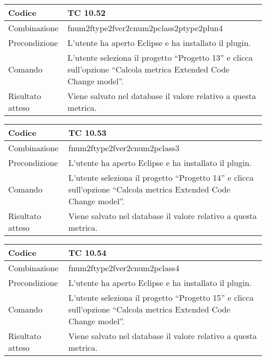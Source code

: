 \begin{table}[ht]
\begin{tabular}{|p{3cm}|p{9cm}|}
\hline
\cellcolor{lightgray}Codice				& TC 10.52								\\
\hline
\cellcolor{lightgray}Combinazione		& fnum2ftype2fver2cnum2pclass2ptype2plun4									\\
\hline
\cellcolor{lightgray}Precondizione		& L'utente ha aperto Eclipse e ha installato il plugin.		\\
\hline
\cellcolor{lightgray}Comando			& L'utente seleziona il progetto ``Progetto 13''  e clicca sull'opzione ``Calcola metrica Extended Code Change model''.	\\
\hline
\cellcolor{lightgray}Risultato atteso	& Viene salvato nel database il valore relativo a questa metrica.\\
\hline
\end{tabular}
\end{table}

\begin{table}[ht]
\begin{tabular}{|p{3cm}|p{9cm}|}
\hline
\cellcolor{lightgray}Codice				& TC 10.53								\\
\hline
\cellcolor{lightgray}Combinazione		& fnum2ftype2fver2cnum2pclass3									\\
\hline
\cellcolor{lightgray}Precondizione		& L'utente ha aperto Eclipse e ha installato il plugin.		\\
\hline
\cellcolor{lightgray}Comando			& L'utente seleziona il progetto ``Progetto 14''  e clicca sull'opzione ``Calcola metrica Extended Code Change model''.	\\
\hline
\cellcolor{lightgray}Risultato atteso	& Viene salvato nel database il valore relativo a questa metrica.\\
\hline
\end{tabular}
\end{table}

\begin{table}[ht]
\begin{tabular}{|p{3cm}|p{9cm}|}
\hline
\cellcolor{lightgray}Codice				& TC 10.54								\\
\hline
\cellcolor{lightgray}Combinazione		& fnum2ftype2fver2cnum2pclass4									\\
\hline
\cellcolor{lightgray}Precondizione		& L'utente ha aperto Eclipse e ha installato il plugin.		\\
\hline
\cellcolor{lightgray}Comando			& L'utente seleziona il progetto ``Progetto 15''  e clicca sull'opzione ``Calcola metrica Extended Code Change model''.	\\
\hline
\cellcolor{lightgray}Risultato atteso	& Viene salvato nel database il valore relativo a questa metrica.\\
\hline
\end{tabular}
\end{table}

\clearpage
